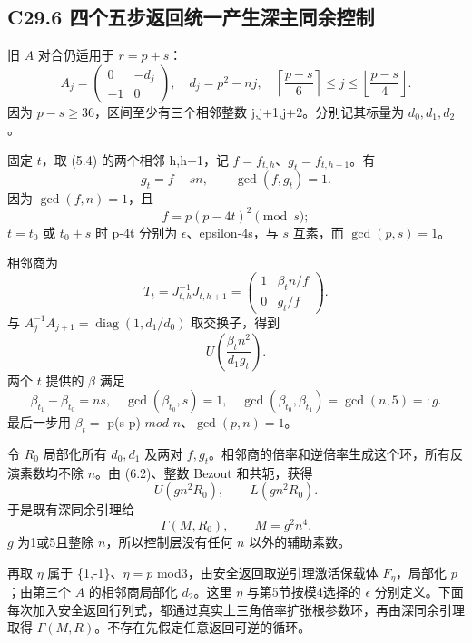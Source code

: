 \documentclass[11pt,a4paper]{article}
\theoremstyle{definition}
\numberwithin{equation}{section}
\begin{document}
\subsection*{\texorpdfstring{{C29.6} {四个五步返回统一产生深主同余控制}}{C29.6 四个五步返回统一产生深主同余控制}}\label{C29-h189}

{旧} {\ensuremath{A}} {对合仍适用于} {\ensuremath{r=p+s}：} \[
A_j=\begin{pmatrix}0&-d_j\\-1&0\end{pmatrix},
\quad d_j=p^2-nj,
\quad
\left\lceil\frac{p-s}{6}\right\rceil\le j\le
\left\lfloor\frac{p-s}{4}\right\rfloor.
\] {因为} {\ensuremath{p-s\ge 36}，区间至少有三个相邻整数} {j,j+1,j+2。分别记其标量为} {\ensuremath{d_{0},d_{1},d_{2}}。}

{固定} {\ensuremath{t}，取} {(5.4)} {的两个相邻} {h,h+1，记} {\ensuremath{f=f_{t,h}}、\ensuremath{g_{t}=f_{t,h+1}}。有} \[
g_t=f-sn,\qquad \gcd(f,g_t)=1.
\tag{C29.6.1}
\] {因为} {\ensuremath{\operatorname{gcd}(f,n)=1}，且} \[
f=p(p-4t)^2\pmod s;
\] {\ensuremath{t=t_{0}}} {或} {\ensuremath{t_{0}+s}} {时} {p-4t} {分别为} {\ensuremath{\epsilon }、epsilon-4s，与} {\ensuremath{s}} {互素，而} {\ensuremath{\operatorname{gcd}(p,s)=1}。}

{相邻商为} \[
T_t=J_{t,h}^{-1}J_{t,h+1}
=\begin{pmatrix}1&\beta_t n/f\\0&g_t/f\end{pmatrix}.
\] {与} {\ensuremath{A_{j}^{-1}A_{j+1}=\operatorname{diag}(1,d_{1}/d_{0})}} {取交换子，得到} \[
U\left(\frac{\beta_t n^2}{d_1g_t}\right).
\tag{C29.6.2}
\] {两个} {\ensuremath{t}} {提供的} {\ensuremath{\beta }} {满足} \[
\beta_{t_1}-\beta_{t_0}=ns,\quad
\gcd(\beta_{t_0},s)=1,\quad
\boxed{\gcd(\beta_{t_0},\beta_{t_1})=\gcd(n,5)=:g.}
\tag{C29.6.3}
\] {最后一步用} {\ensuremath{\beta _{t}=}} {p(s-p)} {\ensuremath{mod}} {\ensuremath{n}、\ensuremath{\operatorname{gcd}(p,n)=1}。}

{令} {\ensuremath{R_{0}}} {局部化所有} {\ensuremath{d_{0},d_{1}}} {及两对} {\ensuremath{f,g_{t}}。相邻商的倍率和逆倍率生成这个环，所有反演素数均不除} {\ensuremath{n}。由} {(6.2)、整数} {Bezout} {和共轭，获得} \[
U(gn^2R_0),\qquad L(gn^2R_0).
\] {于是既有深同余引理给} \[
\boxed{\Gamma(M,R_0),\qquad M=g^2n^4.}
\tag{C29.6.4}
\] {\ensuremath{g}} {为1或5且整除} {\ensuremath{n}，所以控制层没有任何} {\ensuremath{n}} {以外的辅助素数。}

{再取} {\ensuremath{\eta }} {属于} {\{1,-1\}、\ensuremath{\eta =p}} {mod3，由安全返回取逆引理激活保载体} {\ensuremath{F_\eta }，局部化} {\ensuremath{p}；由第三个} {\ensuremath{A}} {的相邻商局部化} {\ensuremath{d_{2}}。这里} {\ensuremath{\eta }} {与第5节按模4选择的} {\ensuremath{\epsilon }} {分别定义。下面每次加入安全返回行列式，都通过真实上三角倍率扩张根参数环，再由深同余引理取得} {\ensuremath{\Gamma (M,R)}。不存在先假定任意返回可逆的循环。}
\end{document}

